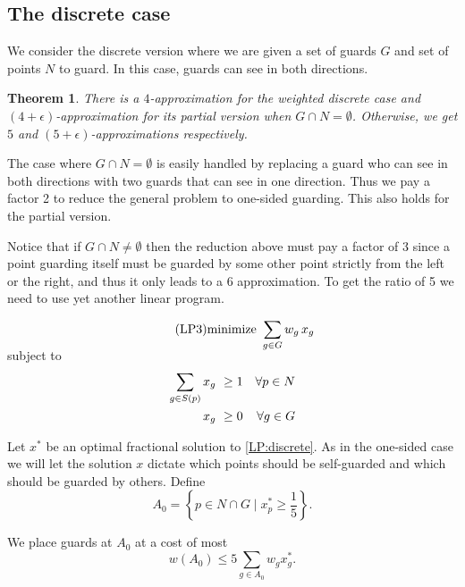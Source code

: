 \documentclass[11pt]{article}
\newtheorem{theorem}{Theorem}
\begin{document}
\subsection{The discrete case}

We consider the discrete version where we are given a set of guards $G$ and
set of points $N$ to guard. In this case, guards can see in both directions.

\begin{theorem} \label{thm:discrete}
  There is a $4$-approximation for the weighted discrete case and $(4 +
  \epsilon)$-approximation for its partial version when $G \cap N =
  \emptyset$. Otherwise, we get $5$ and $(5 + \epsilon)$-approximations respectively.
\end{theorem}

The case where $G \cap N = \emptyset$ is easily handled by replacing a guard
who can see in both directions with two guards that can see in one
direction. Thus we pay a factor 2 to reduce the general problem to one-sided
guarding. This also holds for the partial version.

Notice that if $G \cap N \neq \emptyset$ then the reduction above must pay a
factor of 3 since a point guarding itself must be guarded by some other point
strictly from the left or the right, and thus it only leads to a 6
approximation. To get the ratio of 5 we need to use yet another linear
program.

\begin{gather} \label{LP:discrete} \tag{LP3}
  \text{minimize} \ \sum_{g\in G} w_g\, x_g \\[-6ex] \notag
\end{gather}
\hspace{1.5cm} subject to \\[-3ex]
\begin{align}
  \sum_{g\in S(p)} x_{g}\ & \ge 1 & \forall p\in N \notag \\
  \notag
  x_g\ & \geq 0 & \forall g\in G
\end{align}

Let $x^*$ be an optimal fractional solution to \eqref{LP:discrete}. As in the
one-sided case we will let the solution $x$ dictate which points should be
self-guarded and which should be guarded by others. Define
\begin{equation*}
  A_0 = \left \{p\in N \cap G \mid \textstyle x_{p}^* \ge
    \frac15 \right\}.
\end{equation*}

We place guards at $A_0$ at a cost of most
\begin{equation}
   \label{eq:self-cost}
   w(A_0) \leq 5 \sum_{g \in A_0} w_g x^*_g.
\end{equation}
\end{document}
